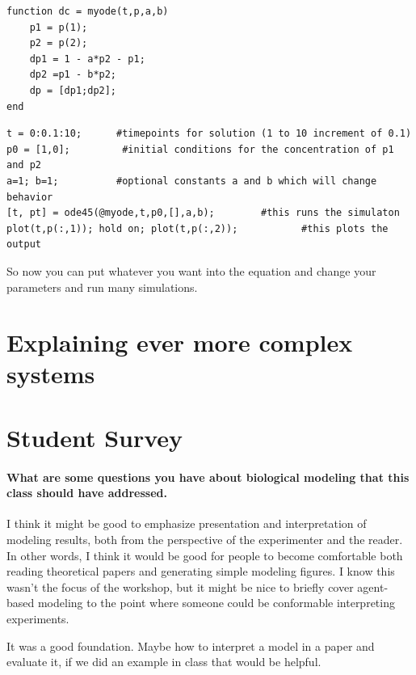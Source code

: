 \begin{verbatim}
function dc = myode(t,p,a,b)
    p1 = p(1);
    p2 = p(2);
    dp1 = 1 - a*p2 - p1;
    dp2 =p1 - b*p2;
    dp = [dp1;dp2];
end
\end{verbatim}

\begin{verbatim}
t = 0:0.1:10;      #timepoints for solution (1 to 10 increment of 0.1)
p0 = [1,0];         #initial conditions for the concentration of p1 and p2
a=1; b=1;          #optional constants a and b which will change behavior
[t, pt] = ode45(@myode,t,p0,[],a,b);        #this runs the simulaton 
plot(t,p(:,1)); hold on; plot(t,p(:,2));           #this plots the output
\end{verbatim}

So now you can put whatever you want into the equation and change your parameters and run many simulations.  





\section{Explaining ever more complex systems}




\section{Student Survey}

\paragraph{What are some questions you have about biological modeling that this class should have addressed.}

I think it might be good to emphasize presentation and interpretation of modeling results, both from the perspective of the experimenter and the reader. In other words, I think it would be good for people to become comfortable both reading theoretical papers and generating simple modeling figures. I know this wasn't the focus of the workshop, but it might be nice to briefly cover agent-based modeling to the point where someone could be conformable interpreting experiments. 

It was a good foundation. Maybe how to interpret a model in a paper and evaluate it, if we did an example in class that would be helpful. 

